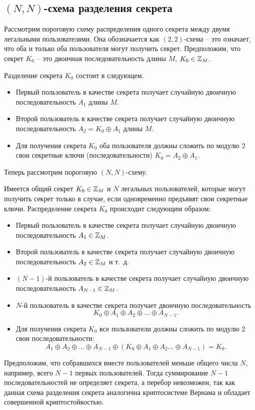 \subsection[$(N, N)$-схема]{$(N, N)$-схема разделения секрета}

Рассмотрим пороговую схему распределения одного секрета между двумя легальными пользователями. Она обозначается как $(2,2)$-схема – это означает, что оба и только оба пользователя могут получить секрет. Предположим, что секрет $K_{0}$ -- это двоичная последовательность длины $M$, $K_{0} \in \mathbb{Z}_{M}$.

Разделение секрета $K_{0}$ состоит в следующем.
\begin{itemize}
    \item Первый пользователь в качестве секрета получает случайную двоичную последовательность $A_{1}$ длины $M$.
    \item Второй пользователь в качестве секрета получает случайную двоичную последовательность $A_{2} =K_{0} \oplus A_{1}$ длины $M$.
    \item Для получения секрета $K_{0}$ оба пользователя должны сложить по модулю 2 свои секретные ключи (последовательности)  $K_{0} = A_{2} \oplus A_{1}$.
\end{itemize}

Теперь рассмотрим пороговую $(N,N)$-схему.

Имеется общий секрет $K_{0} \in \mathbb{Z}_{M}$ и $N$ легальных пользователей, которые могут получить секрет только в случае, если одновременно предъявят свои секретные ключи. Распределение секрета $K_{0}$ происходит следующим образом:

\begin{itemize}
    \item Первый пользователь в качестве секрета получает случайную двоичную последовательность $A_{1} \in \mathbb{Z}_{M}$.
    \item Второй пользователь в качестве секрета получает случайную двоичную последовательность $A_{2} \in \mathbb{Z}_{M}$ и т.~д.
    \item $(N-1)$-й пользователь в качестве секрета получает случайную двоичную последовательность $A_{N-1} \in \mathbb{Z}_{M}$.
    \item $N$-й пользователь в качестве секрета получает двоичную последовательность
        \[ K_0 \oplus A_1 \oplus A_2 \oplus \dots \oplus A_{N-1}. \]
    \item Для получения секрета $K_0$ все пользователи должны сложить по модулю 2 свои последовательности:
        \[ A_1 \oplus A_2 \oplus \dots \oplus A_{N-1} \oplus (K_0 \oplus A_1 \oplus A_2 \dots \oplus A_{N-1}) = K_0. \]
\end{itemize}

Предположим, что собравшихся вместе пользователей меньше общего числа $N$, например, всего $N-1$ первых пользователей. Тогда суммирование $N-1$ последовательностей не определяет секрета, а перебор невозможен, так как данная схема разделения секрета аналогична криптосистеме Вернама и обладает совершенной криптостойкостью.
